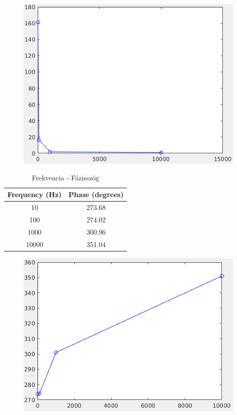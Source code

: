 \documentclass[10pt, conference,a4paper]{ITKproc}
\begin{document}
\begin{figure}[h]
\includegraphics[scale=0.3]{2_f_m}
\centering

\end{figure}


\begin{table}[ht!]
\renewcommand{\arraystretch}{1.3}
\caption{Frekvencia - Fázisszög}
\centering
\begin{tabular}{c||c}
\hline
\bfseries Frequency (Hz) & \bfseries Phase (degrees) \\
\hline\hline
 10 & 273.68\\
\hline
 100 & 274.02\\
\hline
1000 & 300.96\\
\hline
10000 & 351.04\\
\hline

\end{tabular}
\end{table}
\begin{figure}[h]
\includegraphics[scale=0.3]{2_f_p}
\centering

\end{figure}
\end{document}
